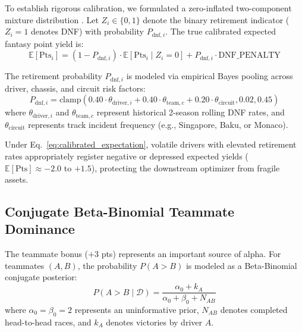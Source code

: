 To establish rigorous calibration, we formulated a zero-inflated two-component mixture distribution \cite{gelman2013bayesian}. Let $Z_i \in \{0, 1\}$ denote the binary retirement indicator ($Z_i = 1$ denotes DNF) with probability $P_{\text{dnf}, i}$. The true calibrated expected fantasy point yield is:
\begin{equation}
\mathbb{E}[\text{Pts}_i] = (1 - P_{\text{dnf}, i}) \cdot \mathbb{E}[\text{Pts}_i \mid Z_i = 0] + P_{\text{dnf}, i} \cdot \text{DNF\_PENALTY}
\label{eq:calibrated_expectation}
\end{equation}

The retirement probability $P_{\text{dnf}, i}$ is modeled via empirical Bayes pooling across driver, chassis, and circuit risk factors:
\begin{equation}
P_{\text{dnf}, i} = \text{clamp}\left( 0.40 \cdot \theta_{\text{driver}, i} + 0.40 \cdot \theta_{\text{team}, c} + 0.20 \cdot \theta_{\text{circuit}}, 0.02, 0.45 \right)
\label{eq:dnf_probability}
\end{equation}
where $\theta_{\text{driver}, i}$ and $\theta_{\text{team}, c}$ represent historical 2-season rolling DNF rates, and $\theta_{\text{circuit}}$ represents track incident frequency (e.g., Singapore, Baku, or Monaco).

Under Eq.~\eqref{eq:calibrated_expectation}, volatile drivers with elevated retirement rates appropriately register negative or depressed expected yields ($\mathbb{E}[\text{Pts}] \approx -2.0$ to $+1.5$), protecting the downstream optimizer from fragile assets.

\subsection{Conjugate Beta-Binomial Teammate Dominance}
The teammate bonus ($+3$ pts) represents an important source of alpha. For teammates $(A, B)$, the probability $P(A > B)$ is modeled as a Beta-Binomial conjugate posterior:
\begin{equation}
P(A > B \mid \mathcal{D}) = \frac{\alpha_0 + k_A}{\alpha_0 + \beta_0 + N_{AB}}
\label{eq:beta_binomial}
\end{equation}
where $\alpha_0 = \beta_0 = 2$ represents an uninformative prior, $N_{AB}$ denotes completed head-to-head races, and $k_A$ denotes victories by driver $A$.
